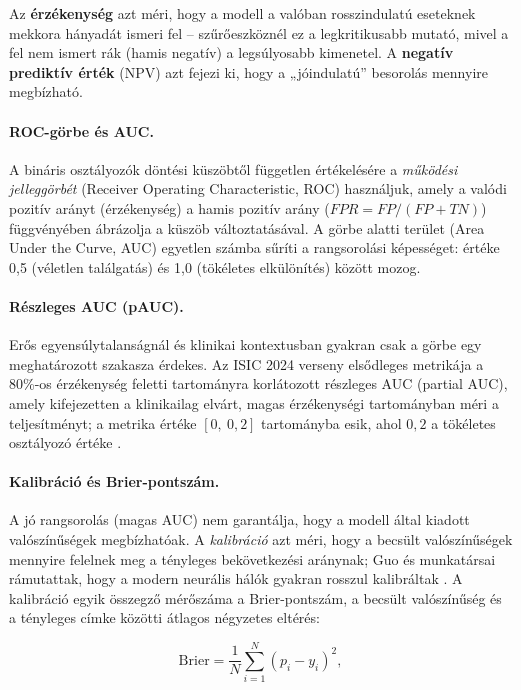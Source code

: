 Az \textbf{érzékenység} azt méri, hogy a modell a valóban rosszindulatú eseteknek
mekkora hányadát ismeri fel -- szűrőeszköznél ez a legkritikusabb mutató, mivel a
fel nem ismert rák (hamis negatív) a legsúlyosabb kimenetel. A \textbf{negatív
prediktív érték} (NPV) azt fejezi ki, hogy a „jóindulatú'' besorolás mennyire
megbízható.

\paragraph{ROC-görbe és AUC.} A bináris osztályozók döntési küszöbtől független
értékelésére a \textit{működési jelleggörbét} (Receiver Operating Characteristic,
ROC) használjuk, amely a valódi pozitív arányt (érzékenység) a hamis pozitív
arány ($FPR = FP/(FP+TN)$) függvényében ábrázolja a küszöb változtatásával. A
görbe alatti terület (Area Under the Curve, AUC) egyetlen számba sűríti a
rangsorolási képességet: értéke 0,5 (véletlen találgatás) és 1,0 (tökéletes
elkülönítés) között mozog.

\paragraph{Részleges AUC (pAUC).} Erős egyensúlytalanságnál és klinikai
kontextusban gyakran csak a görbe egy meghatározott szakasza érdekes. Az ISIC
2024 verseny elsődleges metrikája a 80\%-os érzékenység feletti tartományra
korlátozott részleges AUC (partial AUC), amely kifejezetten a klinikailag
elvárt, magas érzékenységi tartományban méri a teljesítményt; a metrika
értéke $[0,\ 0{,}2]$ tartományba esik, ahol $0{,}2$ a tökéletes osztályozó
értéke \cite{isic2024}.

\paragraph{Kalibráció és Brier-pontszám.} A jó rangsorolás (magas AUC) nem
garantálja, hogy a modell által kiadott valószínűségek megbízhatóak. A
\textit{kalibráció} azt méri, hogy a becsült valószínűségek mennyire felelnek
meg a tényleges bekövetkezési aránynak; Guo és munkatársai rámutattak, hogy a
modern neurális hálók gyakran rosszul kalibráltak \cite{guo2017calibration}. A
kalibráció egyik összegző mérőszáma a Brier-pontszám, a becsült valószínűség és a
tényleges címke közötti átlagos négyzetes eltérés:

\begin{equation}
  \mathrm{Brier} = \frac{1}{N} \sum_{i=1}^{N} (p_i - y_i)^2,
  \label{eq:brier}
\end{equation}

